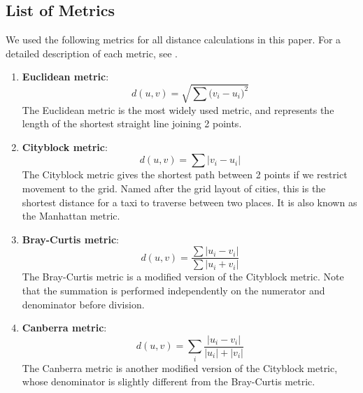\documentclass[conference]{IEEEtran}
\begin{document}
\subsection{List of Metrics} \label{app:list_of_metrics}
We used the following metrics for all distance calculations in this paper. For a detailed description of each metric, see \cite{dezaEncyclopediaDistances2013}.
\begin{enumerate}
    \item \textbf{Euclidean metric}:\\
    \begin{equation} \label{eq:euclidean_metric}
        d(u,v)=\sqrt{\sum \big(v_i - u_i\big)^2}
    \end{equation}
    The Euclidean metric is the most widely used metric, and represents the length of the shortest straight line joining 2 points.

    \item \textbf{Cityblock metric}:\\
    \begin{equation} \label{eq:cityblock_metric}
        d(u,v)={\sum\big|v_i - u_i\big|}
    \end{equation}
    The Cityblock metric gives the shortest path between 2 points if we restrict movement to the grid. Named after the grid layout of cities, this is the shortest distance for a taxi to traverse between two places. It is also known as the Manhattan metric.

    \item \textbf{Bray-Curtis metric}:\\
    \begin{equation} \label{eq:bray_curtis_metric}
        d(u,v)=\dfrac{\sum\left|u_{i}-v_{i}\right|}{\sum\left|u_{i}+v_{i}\right|}
    \end{equation}
    The Bray-Curtis metric is a modified version of the Cityblock metric. Note that the summation is performed independently on the numerator and denominator before division.

    \item \textbf{Canberra metric}:\\
    \begin{equation} \label{eq:canberra_metric}
        d(u, v)=\sum_{i} \frac{\left|u_{i}-v_{i}\right|}{\left|u_{i}\right|+\left|v_{i}\right|}
    \end{equation}
    The Canberra metric is another modified version of the Cityblock metric, whose denominator is slightly different from the Bray-Curtis metric.


\end{enumerate}
\end{document}
